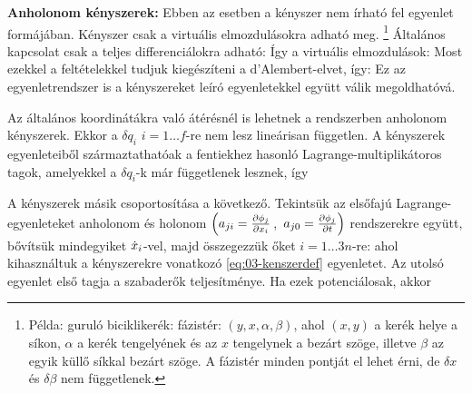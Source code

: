   {\bf Anholonom kényszerek:}
   Ebben az esetben a kényszer nem írható fel  egyenlet formájában. Kényszer csak a virtuális elmozdulásokra adható meg.
   \footnote{Példa: guruló biciklikerék: fázistér: $(y,x,\alpha,\beta)$, ahol $(x,y)$ a kerék helye a síkon, $\alpha$ a kerék tengelyének és az $x$ tengelynek a bezárt szöge, illetve $\beta$ az egyik küllő síkkal bezárt szöge. A fázistér minden pontját el lehet érni, de $\delta x$ és $\delta \beta$ nem függetlenek. }
   Általános kapcsolat csak a teljes differenciálokra adható:
   Így a virtuális elmozdulások:
   Most ezekkel a feltételekkel tudjuk kiegészíteni a d'Alembert-elvet, így:
   Ez az egyenletrendszer is a kényszereket leíró egyenletekkel együtt válik megoldhatóvá.
   
   Az általános koordinátákra való átérésnél is lehetnek a rendszerben anholonom kényszerek. Ekkor a $\delta q_i$ $i=1\dots f$-re nem lesz lineárisan független. A kényszerek egyenleteiből származtathatóak a fentiekhez hasonló Lagrange-multiplikátoros tagok, amelyekkel a $\delta q_i$-k már függetlenek lesznek, így

   
   A kényszerek másik csoportosítása a következő. Tekintsük az elsőfajú Lagrange-egyenleteket anholonom és holonom $\left(a_{ji}=\frac{\partial \phi_j}{\partial x_i}\right.$, $\left.a_{j0}=\frac{\partial \phi_j}{\partial t}\right)$ rendszerekre együtt, bővítsük mindegyiket $\dot{x}_i$-vel, majd összegezzük őket  $i=1\dots 3n$-re:
   ahol kihasználtuk a kényszerekre vonatkozó \eqref{eq:03-kenszerdef} egyenletet. Az utolsó egyenlet első tagja a szabaderők teljesítménye. Ha ezek potenciálosak, akkor 
   
